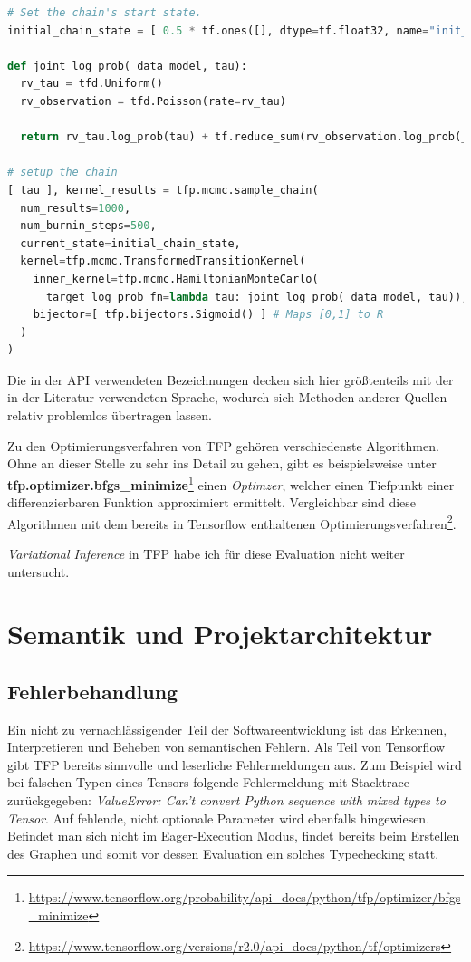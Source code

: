 \documentclass[12pt]{article}
\begin{document}
\begin{lstlisting}[language=Python, caption={Verwendung des Hamiltonian Monte Carlo Algorithmus (gekürzt)}, label={lst:mcmc}]
# Set the chain's start state.
initial_chain_state = [ 0.5 * tf.ones([], dtype=tf.float32, name="init_tau") ]

def joint_log_prob(_data_model, tau):
  rv_tau = tfd.Uniform()
  rv_observation = tfd.Poisson(rate=rv_tau)

  return rv_tau.log_prob(tau) + tf.reduce_sum(rv_observation.log_prob(_data_model))

# setup the chain
[ tau ], kernel_results = tfp.mcmc.sample_chain(
  num_results=1000,
  num_burnin_steps=500,
  current_state=initial_chain_state,
  kernel=tfp.mcmc.TransformedTransitionKernel(
    inner_kernel=tfp.mcmc.HamiltonianMonteCarlo(
      target_log_prob_fn=lambda tau: joint_log_prob(_data_model, tau)),
    bijector=[ tfp.bijectors.Sigmoid() ] # Maps [0,1] to R  
  )
)
\end{lstlisting}

Die in der API verwendeten Bezeichnungen decken sich hier größtenteils mit der in der Literatur verwendeten Sprache, wodurch sich Methoden anderer Quellen relativ problemlos übertragen lassen. 

Zu den Optimierungsverfahren von TFP gehören verschiedenste Algorithmen. Ohne an dieser Stelle zu sehr ins Detail zu gehen, gibt es beispielsweise unter \textbf{tfp.optimizer.bfgs\_minimize}\footnote{\url{https://www.tensorflow.org/probability/api_docs/python/tfp/optimizer/bfgs_minimize}} einen \textit{Optimzer}\cite{Nocedal2006}, welcher einen Tiefpunkt einer differenzierbaren Funktion approximiert ermittelt. Vergleichbar sind diese Algorithmen mit dem bereits in Tensorflow enthaltenen Optimierungsverfahren\footnote{\url{https://www.tensorflow.org/versions/r2.0/api_docs/python/tf/optimizers}}.

\textit{Variational Inference} in TFP habe ich für diese Evaluation nicht weiter untersucht.

\section{Semantik und Projektarchitektur}

\subsection{Fehlerbehandlung}
Ein nicht zu vernachlässigender Teil der Softwareentwicklung ist das Erkennen, Interpretieren und Beheben von semantischen Fehlern. Als Teil von Tensorflow gibt TFP bereits sinnvolle und leserliche Fehlermeldungen aus. Zum Beispiel wird bei falschen Typen eines Tensors folgende Fehlermeldung mit Stacktrace zurückgegeben: \textit{ValueError: Can't convert Python sequence with mixed types to Tensor}. Auf fehlende, nicht optionale Parameter wird ebenfalls hingewiesen. Befindet man sich nicht im Eager-Execution Modus, findet bereits beim Erstellen des Graphen und somit vor dessen Evaluation ein solches Typechecking statt. 
\end{document}
